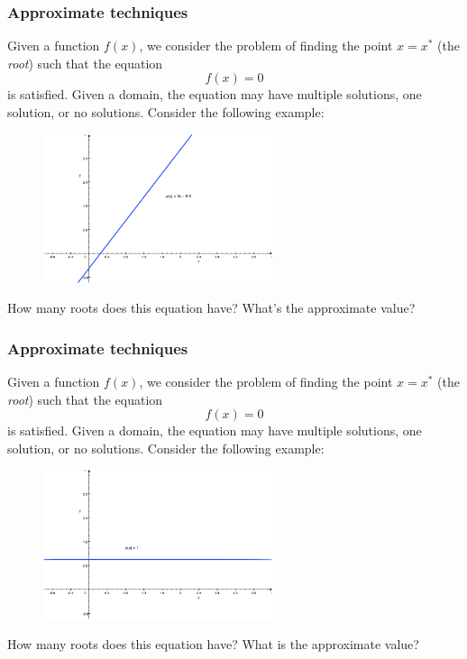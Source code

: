 \documentclass{if-beamer}
\begin{document}
\begin{frame}
\frametitle{Approximate techniques}
Given a function $f(x)$, we consider the problem of finding the point $x = x^{*}$ (the
\textit{root}) such that the equation
\begin{equation*}
f(x) = 0
\end{equation*}
is satisfied. Given a domain, the equation may have multiple solutions, one
solution, or no solutions.  Consider the following example:
\begin{figure}
	\center
	\includegraphics[width=0.6\textwidth]{figures/linear}
\end{figure}
How many roots does this equation have? What's the approximate value?
\end{frame}

\begin{frame}
\frametitle{Approximate techniques}
Given a function $f(x)$, we consider the problem of finding the point $x = x^{*}$ (the
\textit{root}) such that the equation
\begin{equation*}
f(x) = 0
\end{equation*}
is satisfied. Given a domain, the equation may have multiple solutions, one
solution, or no solutions.  Consider the following example:
\begin{figure}
	\center
	\includegraphics[width=0.6\textwidth]{figures/const}
\end{figure}
How many roots does this equation have? What is the approximate value? 
\end{frame}
\end{document}
